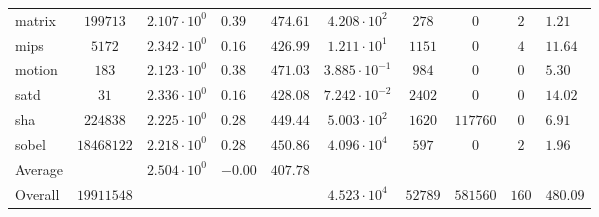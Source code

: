 \begin{tabular}{|l|c|HHc|c|c|c|cH|}
matrix        & $ 199713   $ & $ 2.107 \cdot 10^{0} $ & $ 0.39  $ & $ 474.61 $ & $ 4.208 \cdot 10^{2}  $ & $ 278   $ & $ 0      $ & $ 2   $ & $ 1.21    $ \\
mips          & $ 5172     $ & $ 2.342 \cdot 10^{0} $ & $ 0.16  $ & $ 426.99 $ & $ 1.211 \cdot 10^{1}  $ & $ 1151  $ & $ 0      $ & $ 4   $ & $ 11.64   $ \\
motion        & $ 183      $ & $ 2.123 \cdot 10^{0} $ & $ 0.38  $ & $ 471.03 $ & $ 3.885 \cdot 10^{-1} $ & $ 984   $ & $ 0      $ & $ 0   $ & $ 5.30    $ \\
satd          & $ 31       $ & $ 2.336 \cdot 10^{0} $ & $ 0.16  $ & $ 428.08 $ & $ 7.242 \cdot 10^{-2} $ & $ 2402  $ & $ 0      $ & $ 0   $ & $ 14.02   $ \\
sha           & $ 224838   $ & $ 2.225 \cdot 10^{0} $ & $ 0.28  $ & $ 449.44 $ & $ 5.003 \cdot 10^{2}  $ & $ 1620  $ & $ 117760 $ & $ 0   $ & $ 6.91    $ \\
sobel         & $ 18468122 $ & $ 2.218 \cdot 10^{0} $ & $ 0.28  $ & $ 450.86 $ & $ 4.096 \cdot 10^{4}  $ & $ 597   $ & $ 0      $ & $ 2   $ & $ 1.96    $ \\
\hline
Average       & $          $ & $ 2.504 \cdot 10^{0} $ & $ -0.00 $ & $ 407.78 $ & $                     $ & $       $ & $        $ & $     $ & $         $ \\
\hline
Overall       & $ 19911548 $ & $                    $ & $       $ & $        $ & $ 4.523 \cdot 10^{4}  $ & $ 52789 $ & $ 581560 $ & $ 160 $ & $ 480.09  $ \\
\hline
\end{tabular}

